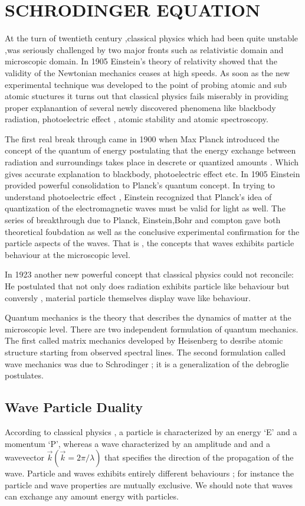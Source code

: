 \chapter{SCHRODINGER EQUATION}
 At the turn of twentieth century ,classical physics which had been quite unstable ,was seriously challenged by two major fronts such as relativistic domain and microscopic domain. In 1905 Einstein's theory of relativity showed that the validity of the Newtonian mechanics ceases at high speeds. As soon as the new experimental technique was developed to the point of probing atomic and sub atomic stuctures it turns out that classical physics fails miserably in providing proper explanantion of several newly discovered phenomena like blackbody radiation, photoelectric effect , atomic stability and atomic spectroscopy.
  \par The first real break through came in 1900 when Max Planck introduced the concept of the quantum of energy postulating that the energy exchange between radiation and surroundings takes place in descrete or quantized amounts . Which gives accurate explanation to blackbody, photoelectric effect etc. In 1905 Einstein provided powerful consolidation to Planck's quantum concept. In trying to understand photoelectric effect , Einstein recognized that Planck's idea of quantization of the electromagnetic waves must be valid for light as well. The series of breakthrough due to Planck, Einstein,Bohr and compton gave both theoretical foubdation as well as the conclusive experimental confirmation for the particle aspects of the waves. That is , the concepts that waves exhibits particle behaviour at the microscopic level.
  \par In 1923 another new powerful concept that classical physics could not reconcile: He postulated that not only does radiation exhibits particle like behaviour but conversly , material particle themselves display wave like behaviour.
  \par Quantum mechanics is the theory that describes the dynamics of matter at the microscopic level. There are two independent formulation of quantum mechanics. The first called matrix mechanics developed by Heisenberg to desribe atomic structure starting from observed spectral lines. The second formulation called wave mechanics was due to Schrodinger ; it is a generalization of the debroglie postulates.
  \section{Wave Particle Duality}
    According to classical physics , a particle is characterized by an energy `E' and a momentum `P', whereas a wave characterized by an amplitude and and a wavevector $\vec{k}(\vec{k}=2\pi/\lambda)$ that specifies the direction of the propagation of the wave. Particle and waves exhibits entirely different behaviours ; for instance the particle and wave properties are mutually exclusive. We should note that waves can exchange any amount energy with particles.
